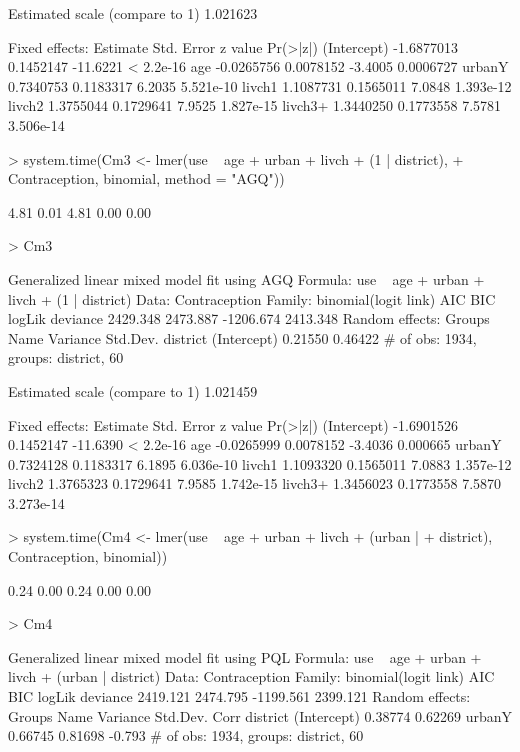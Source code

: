 \documentclass[12pt]{article}
\begin{document}
\begin{Schunk}
\begin{Soutput}
Estimated scale (compare to 1)  1.021623 

Fixed effects:
              Estimate Std. Error  z value  Pr(>|z|)
(Intercept) -1.6877013  0.1452147 -11.6221 < 2.2e-16
age         -0.0265756  0.0078152  -3.4005 0.0006727
urbanY       0.7340753  0.1183317   6.2035 5.521e-10
livch1       1.1087731  0.1565011   7.0848 1.393e-12
livch2       1.3755044  0.1729641   7.9525 1.827e-15
livch3+      1.3440250  0.1773558   7.5781 3.506e-14
\end{Soutput}
\begin{Sinput}
> system.time(Cm3 <- lmer(use ~ age + urban + livch + (1 | district), 
+     Contraception, binomial, method = "AGQ"))
\end{Sinput}
\begin{Soutput}
[1] 4.81 0.01 4.81 0.00 0.00
\end{Soutput}
\begin{Sinput}
> Cm3
\end{Sinput}
\begin{Soutput}
Generalized linear mixed model fit using AGQ 
Formula: use ~ age + urban + livch + (1 | district) 
   Data: Contraception 
 Family: binomial(logit link)
      AIC      BIC    logLik deviance
 2429.348 2473.887 -1206.674 2413.348
Random effects:
     Groups        Name    Variance    Std.Dev. 
   district (Intercept)     0.21550     0.46422 
# of obs: 1934, groups: district, 60

Estimated scale (compare to 1)  1.021459 

Fixed effects:
              Estimate Std. Error  z value  Pr(>|z|)
(Intercept) -1.6901526  0.1452147 -11.6390 < 2.2e-16
age         -0.0265999  0.0078152  -3.4036  0.000665
urbanY       0.7324128  0.1183317   6.1895 6.036e-10
livch1       1.1093320  0.1565011   7.0883 1.357e-12
livch2       1.3765323  0.1729641   7.9585 1.742e-15
livch3+      1.3456023  0.1773558   7.5870 3.273e-14
\end{Soutput}
\begin{Sinput}
> system.time(Cm4 <- lmer(use ~ age + urban + livch + (urban | 
+     district), Contraception, binomial))
\end{Sinput}
\begin{Soutput}
[1] 0.24 0.00 0.24 0.00 0.00
\end{Soutput}
\begin{Sinput}
> Cm4
\end{Sinput}
\begin{Soutput}
Generalized linear mixed model fit using PQL 
Formula: use ~ age + urban + livch + (urban | district) 
   Data: Contraception 
 Family: binomial(logit link)
      AIC      BIC    logLik deviance
 2419.121 2474.795 -1199.561 2399.121
Random effects:
 Groups   Name        Variance Std.Dev. Corr   
 district (Intercept) 0.38774  0.62269         
          urbanY      0.66745  0.81698  -0.793 
# of obs: 1934, groups: district, 60


\end{Soutput}
\end{Schunk}
\end{document}
